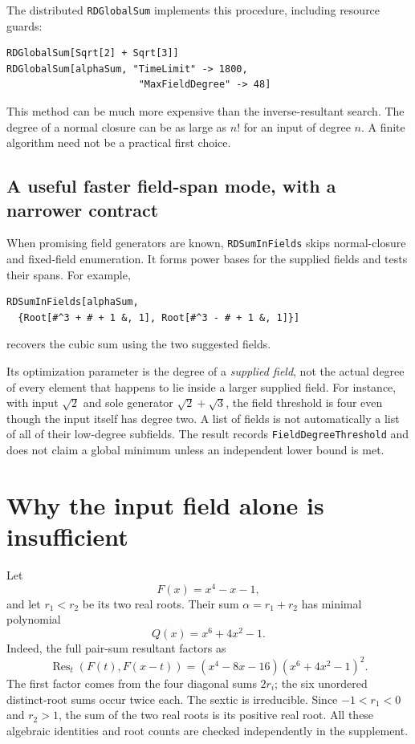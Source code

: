 \documentclass[11pt,letterpaper]{article}
\theoremstyle{definition}
\newcommand{\Res}{\operatorname{Res}}
\newcommand{\code}[1]{\texttt{#1}}
\begin{document}
The distributed \code{RDGlobalSum} implements this procedure, including resource guards:
\begin{samepage}
\begin{lstlisting}
RDGlobalSum[Sqrt[2] + Sqrt[3]]
RDGlobalSum[alphaSum, "TimeLimit" -> 1800,
                       "MaxFieldDegree" -> 48]
\end{lstlisting}
\end{samepage}
This method can be much more expensive than the inverse-resultant search. The degree of a normal closure can be as large as $n!$ for an input of degree $n$. A finite algorithm need not be a practical first choice.

\subsection{A useful faster field-span mode, with a narrower contract}
When promising field generators are known, \code{RDSumInFields} skips normal-closure and fixed-field enumeration. It forms power bases for the supplied fields and tests their spans. For example,
\begin{samepage}
\begin{lstlisting}
RDSumInFields[alphaSum,
  {Root[#^3 + # + 1 &, 1], Root[#^3 - # + 1 &, 1]}]
\end{lstlisting}
\end{samepage}
recovers the cubic sum using the two suggested fields.

Its optimization parameter is the degree of a \emph{supplied field}, not the actual degree of every element that happens to lie inside a larger supplied field. For instance, with input $\sqrt2$ and sole generator $\sqrt2+\sqrt3$, the field threshold is four even though the input itself has degree two. A list of fields is not automatically a list of all of their low-degree subfields. The result records \code{FieldDegreeThreshold} and does not claim a global minimum unless an independent lower bound is met.

\section{Why the input field alone is insufficient}
Let
\[
 F(x)=x^4-x-1,
\]
and let $r_1<r_2$ be its two real roots. Their sum $\alpha=r_1+r_2$ has minimal polynomial
\begin{equation}\label{eq:quarticpairsum}
 Q(x)=x^6+4x^2-1.
\end{equation}
Indeed, the full pair-sum resultant factors as
\[
 \Res_t(F(t),F(x-t))=(x^4-8x-16)(x^6+4x^2-1)^2.
\]
The first factor comes from the four diagonal sums $2r_i$; the six unordered distinct-root sums occur twice each. The sextic is irreducible. Since $-1<r_1<0$ and $r_2>1$, the sum of the two real roots is its positive real root. All these algebraic identities and root counts are checked independently in the supplement.
\end{document}
